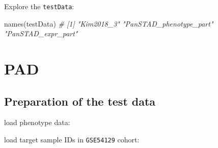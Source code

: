 \documentclass[
  12pt,
]{book}
\newenvironment{Shaded}{\begin{snugshade}}{\end{snugshade}}
\newcommand{\CommentTok}[1]{\textcolor[rgb]{0.56,0.35,0.01}{\textit{#1}}}
\newcommand{\FunctionTok}[1]{\textcolor[rgb]{0.00,0.00,0.00}{#1}}
\newcommand{\NormalTok}[1]{#1}
\newcommand{\OtherTok}[1]{\textcolor[rgb]{0.56,0.35,0.01}{#1}}
\newcommand{\SpecialCharTok}[1]{\textcolor[rgb]{0.00,0.00,0.00}{#1}}
\begin{document}
Explore the \texttt{testData}:

\begin{Shaded}
\begin{Highlighting}[]
\FunctionTok{names}\NormalTok{(testData)}
\CommentTok{\# [1] "Kim2018\_3"              "PanSTAD\_phenotype\_part" "PanSTAD\_expr\_part"}
\end{Highlighting}
\end{Shaded}

\hypertarget{pad}{%
\section{PAD}\label{pad}}

\hypertarget{preparation-of-the-test-data}{%
\subsection{Preparation of the test data}\label{preparation-of-the-test-data}}

load phenotype data:

\begin{Shaded}
\end{Shaded}

load target sample IDs in \texttt{GSE54129} cohort:
\end{document}
